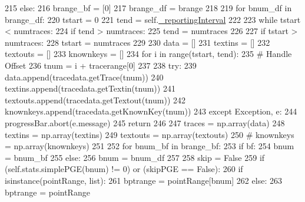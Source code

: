 \begin{DoxyCode}
{{215         \textcolor{keywordflow}{else}:
216             brange\_bf = [0]
217             brange\_df = brange
218 
219         \textcolor{keywordflow}{for} bnum\_df \textcolor{keywordflow}{in} brange\_df:
220             tstart = 0
221             tend = self.\hyperlink{classsoftware_1_1chipwhisperer_1_1analyzer_1_1attacks_1_1cpa__algorithms_1_1progressive_1_1CPAProgressive_ad829dac993aa00e8aecef66d5ff0f542}{\_reportingInterval}
222 
223             \textcolor{keywordflow}{while} tstart < numtraces:
224                 \textcolor{keywordflow}{if} tend > numtraces:
225                     tend = numtraces
226 
227                 \textcolor{keywordflow}{if} tstart > numtraces:
228                     tstart = numtraces
229 
230                 data = []
231                 textins = []
232                 textouts = []
233                 knownkeys = []
234                 \textcolor{keywordflow}{for} i \textcolor{keywordflow}{in} range(tstart, tend):
235                     \textcolor{comment}{# Handle Offset}
236                     tnum = i + tracerange[0]
237 
238                     \textcolor{keywordflow}{try}:
239                         data.append(tracedata.getTrace(tnum))
240                         textins.append(tracedata.getTextin(tnum))
241                         textouts.append(tracedata.getTextout(tnum))
242                         knownkeys.append(tracedata.getKnownKey(tnum))
243                     \textcolor{keywordflow}{except} Exception, e:
244                         progressBar.abort(e.message)
245                         \textcolor{keywordflow}{return}
246 
247                 traces = np.array(data)
248                 textins = np.array(textins)
249                 textouts = np.array(textouts)
250                 \textcolor{comment}{# knownkeys = np.array(knownkeys)}
251 
252                 \textcolor{keywordflow}{for} bnum\_bf \textcolor{keywordflow}{in} brange\_bf:
253                     \textcolor{keywordflow}{if} bf:
254                         bnum = bnum\_bf
255                     \textcolor{keywordflow}{else}:
256                         bnum = bnum\_df
257 
258                     skip = \textcolor{keyword}{False}
259                     \textcolor{keywordflow}{if} (self.stats.simplePGE(bnum) != 0) \textcolor{keywordflow}{or} (skipPGE == \textcolor{keyword}{False}):
260                         \textcolor{keywordflow}{if} isinstance(pointRange, list):
261                             bptrange = pointRange[bnum]
262                         \textcolor{keywordflow}{else}:
263                             bptrange = pointRange
}}
\end{DoxyCode}
